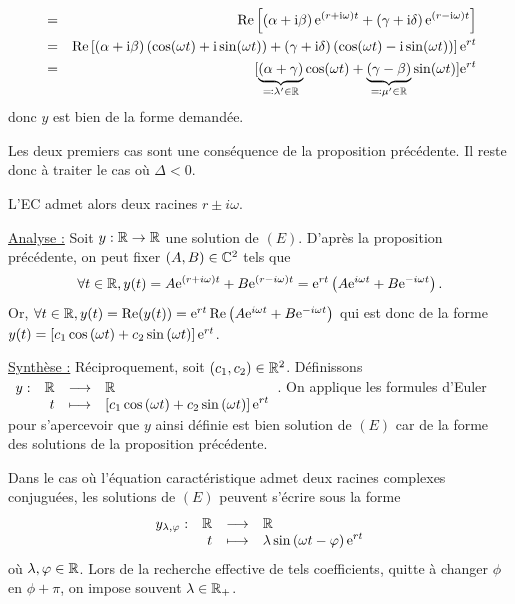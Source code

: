 \documentclass{magnoliaold}
\begin{document}
\begin{preuve}
\begin{francois}
\begin{itemize}
\begin{itemize}
\begin{eqnarray*}
&=& \mathop{\rm Re}\left[\left(\alpha+{\rm i}\beta\right){\rm e}^{(r+{\rm i}\omega)t}+\left(\gamma+{\rm i}\delta\right){\rm e}^{(r-{\rm i}\omega)t}\right]\\
&=& \mathop{\rm Re}\left[\left(\alpha+{\rm i}\beta\right)\left(\cos(\omega t)+{\rm i}\sin(\omega t)\right)+\left(\gamma+{\rm i}\delta\right)\left(\cos(\omega t)-{\rm i}\sin(\omega t)\right)\right]{\rm e}^{rt}\\
&=& [\underbrace{(\alpha+\gamma)}_{\eqqcolon \lambda'\in\mathbb{R}}\cos(\omega t)+\underbrace{(\gamma-\beta)}_{\eqqcolon \mu'\in\mathbb{R}}\sin(\omega t)]{\rm e}^{rt}
\end{eqnarray*}
donc $y$ est bien de la forme demandée.
\end{itemize}
\end{itemize}
\end{francois}
\begin{victor}
Les deux premiers cas sont une conséquence de la proposition précédente. Il reste donc à traiter le cas où $\Delta<0$.

L'EC admet alors deux racines $r\pm i\omega$. 

\underline{Analyse :} Soit $y:\mathbb{R}\to\mathbb{R}$ une solution de $(E)$. D'après la proposition précédente, on peut fixer $(A,B)\in \mathbb{C}^2$ tels que \[\forall t\in\mathbb{R}, y(t)=A{\rm e}^{(r+i\omega)t}+B{\rm e}^{(r-i\omega)t}={\rm e}^{rt}\left(A{\rm e}^{i\omega t}+B{\rm e}^{-i\omega t}\right).\]
Or, $\forall t\in\mathbb{R}, y(t)=\mathop{\rm Re}(y(t))={\rm e}^{rt}\mathop{\rm Re}\left(A{\rm e}^{i\omega t}+B{\rm e}^{-i\omega t}\right)$ qui est donc de la forme $y(t)=\left[c_1\cos\left(\omega t\right)+c_2\sin\left(\omega t\right)\right]{\rm e}^{r t}$.

\underline{Synthèse :} Réciproquement, soit $(c_1,c_2)\in\mathbb{R}^2$. Définissons $\begin{array}[t]{lrcl} \displaystyle{y} : & \displaystyle{\mathbb{R}} & \longrightarrow & \displaystyle{\mathbb{R}} \\ & \displaystyle{t} & \longmapsto & \displaystyle{\left[c_1\cos\left(\omega t\right)+c_2\sin\left(\omega t\right)\right]{\rm e}^{r t}} \end{array}$.
On applique les formules d'Euler pour s'apercevoir que $y$ ainsi définie est bien solution de $(E)$ car de la forme des solutions de la proposition précédente.
\end{victor}
\end{preuve}

\begin{remarqueUnique}
\remarque Dans le cas où l'équation caractéristique admet deux racines complexes
  conjuguées, les solutions de $(E)$ peuvent s'écrire sous la forme
  \[\begin{array}[t]{lrcl} \displaystyle{y_{\lambda,\varphi}} : & \displaystyle{\mathbb{R}} & \longrightarrow & \displaystyle{\mathbb{R}} \\ & \displaystyle{t} & \longmapsto & \displaystyle{\lambda \sin\left(\omega t-\varphi\right){\rm e}^{r t}} \end{array}\]
  où $\lambda,\varphi\in\mathbb{R}$. Lors de la recherche effective de tels coefficients, 
  quitte à changer $\phi$ en $\phi+\pi$, on impose souvent $\lambda\in\mathbb{R}_+$.
\end{remarqueUnique}
\end{document}
